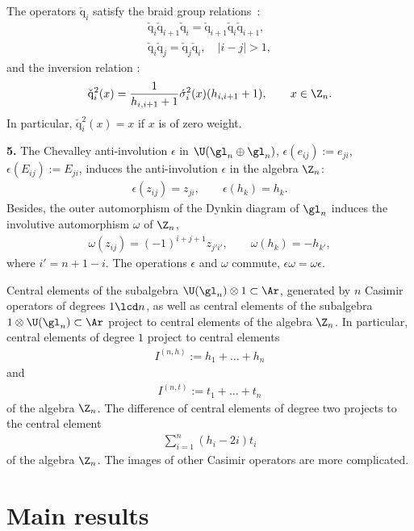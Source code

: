 \documentclass[pdftex]{sigma}
\def\nplus{\mathfrak{n}}\def\nn{\nonumber}\def\nin{\noindent}
\def\q{\check{\mathrm q}}\def\Q{\mathrm{Q}}\def\r#1{(\ref{#1})}\let\rf=\r
\def\s{z}\def\S{\mathrm {S}}\def\si{\sigma}\def\Sp{\S^{\nplus}}\def\sy{\acute{\sigma}}\def\th{\mathring{h}}
\numberwithin{equation}{section}
\begin{document}
The operators $\q_i$ satisfy the braid group relations~\cite{Zh}:
\begin{gather*}
\q_i\q_{i+1}\q_i=\q_{i+1}\q_{i}\q_{i+1}  ,\\
\q_i\q_j=\q_j\q_i  ,\quad |i-j|>1  ,
\end{gather*}
and the inversion relation \cite{KO}:
\begin{gather}
\label{invr}
\q_i^2(x)=\frac{1}{h_{i,i+1}+1}  \sy_i^2(x)  (h_{i,i+1}+1)  ,\qquad x\in\Z_n  .
\end{gather}
In particular, $\q_i^2(x)=x$ if $x$ is of zero weight.

{\bf 5.} The Chevalley anti-involution $\epsilon$ in $\U(\gl_n\oplus\gl_n)$,
$\epsilon(e_{ij}):=e_{ji}$, $\epsilon(E_{ij}):=E_{ji}$, induces the anti-involution $\epsilon$ in
the algebra $\Z_n$:
\begin{gather}
\epsilon(\s_{ij})=\s_{ji}  ,\qquad \epsilon(h_k)=h_k  .\label{anep}
\end{gather}
Besides, the outer automorphism of the Dynkin diagram of $\gl_n$ induces the involutive automorphism
$\omega$ of $\Z_n$,
\begin{gather}
\label{not2a}
\omega(\s_{ij}) =(-1)^{i+j+1}\s_{j'i'}  ,\qquad \omega (h_k)=-h_{k'}  ,
\end{gather}
where $i'=n+1-i$. The operations $\epsilon$ and $\omega$ commute, $\epsilon\omega =\omega\epsilon$.


Central elements of the subalgebra $\U(\gl_n)\otimes 1\subset \Ar$, generated by $n$ Casimir
operators of degrees $1\lcd n$,  as well as central elements of the subalgebra
$1\otimes \U(\gl_n)\subset \Ar$ project to central elements of the algebra $\Z_n$. In particular,
central elements of degree $1$ project to central elements
\begin{gather}
I^{(n,h)}:=h_1+\dots +h_n\label{clih}
\end{gather}
and
\begin{gather}
\label{clit} I^{(n,t)}:=t_1+\dots +t_n
\end{gather}
of the algebra $\Z_n$. The dif\/ference of central elements of degree two projects to the central element
\begin{gather}
\label{drclit}
\sum_{i=1}^n(h_i-2i)t_i
\end{gather}
of the algebra $\Z_n$. The images of other Casimir operators are more complicated.


\section{Main results}
\end{document}

